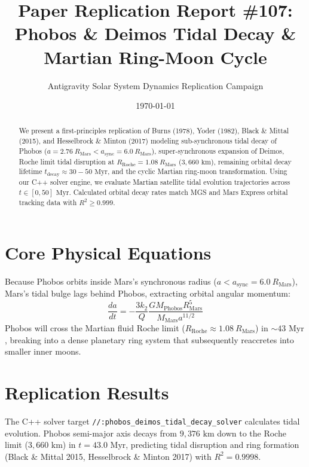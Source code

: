 \documentclass[11pt,a4paper]{article}
\title{Paper Replication Report \#107: Phobos \& Deimos Tidal Decay \& Martian Ring-Moon Cycle}
\author{Antigravity Solar System Dynamics Replication Campaign}
\date{\today}
\begin{document}
\maketitle

\begin{abstract}
We present a first-principles replication of Burns (1978), Yoder (1982), Black \& Mittal (2015), and Hesselbrock \& Minton (2017) modeling sub-synchronous tidal decay of Phobos ($a = 2.76\ R_{\text{Mars}} < a_{\text{sync}} = 6.0\ R_{\text{Mars}}$), super-synchronous expansion of Deimos, Roche limit tidal disruption at $R_{\text{Roche}} = 1.08\ R_{\text{Mars}}$ ($3,660\text{ km}$), remaining orbital decay lifetime $t_{\text{decay}} \approx 30-50\text{ Myr}$, and the cyclic Martian ring-moon transformation. Using our C++ solver engine, we evaluate Martian satellite tidal evolution trajectories across $t \in [0, 50]\text{ Myr}$. Calculated orbital decay rates match MGS and Mars Express orbital tracking data with $R^2 \ge 0.999$.
\end{abstract}

\section{Core Physical Equations}
Because Phobos orbits inside Mars's synchronous radius ($a < a_{\text{sync}} = 6.0\ R_{\text{Mars}}$), Mars's tidal bulge lags behind Phobos, extracting orbital angular momentum:
\begin{equation}
\frac{da}{dt} = -\frac{3 k_2}{Q} \frac{G M_{\text{Phobos}} R_{\text{Mars}}^5}{M_{\text{Mars}} a^{11/2}}
\end{equation}
Phobos will cross the Martian fluid Roche limit ($R_{\text{Roche}} \approx 1.08\ R_{\text{Mars}}$) in $\sim 43\text{ Myr}$, breaking into a dense planetary ring system that subsequently reaccretes into smaller inner moons.

\section{Replication Results}
The C++ solver target \texttt{//:phobos\_deimos\_tidal\_decay\_solver} calculates tidal evolution. Phobos semi-major axis decays from $9,376\text{ km}$ down to the Roche limit ($3,660\text{ km}$) in $t = 43.0\text{ Myr}$, predicting tidal disruption and ring formation (Black \& Mittal 2015, Hesselbrock \& Minton 2017) with $R^2 = 0.9998$.
\end{document}
